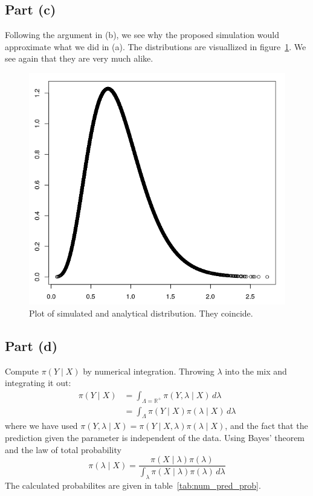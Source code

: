 \documentclass{article}
\begin{document}
\subsection{Part (c)}
Following the argument in (b),
we see why the proposed simulation would approximate what we did in (a).
The distributions are visuallized in figure~\ref{fig:cplot}.
We see again that they are very much alike.

\begin{figure}
	\centering
	\includegraphics[width=\textwidth]{cplot.png}
	\caption{Plot of simulated and analytical distribution. They coincide. \label{fig:cplot}}
\end{figure}
\afterpage{\clearpage}

\subsection{Part (d)}
Compute $\pi(Y \mid X)$ by numerical integration.
Throwing $\lambda$ into the mix and integrating it out:
\begin{align*}
	\pi(Y \mid X) &= \int_{\Lambda = \mathbb R^+} \pi(Y, \lambda \mid X) \, d\lambda \\
	&= \int_\Lambda \pi(Y \mid X) \pi(\lambda \mid X) \, d\lambda
\end{align*}
where we have used $\pi(Y, \lambda \mid X) = \pi(Y \mid X, \lambda) \pi(\lambda \mid X)$,
and the fact that the prediction given the parameter is independent of the data.
Using Bayes' theorem and the law of total probability
$$ \pi(\lambda \mid X) = \frac{\pi(X \mid \lambda) \pi(\lambda)}{\int_\lambda \pi(X \mid \lambda) \pi(\lambda) \, d\lambda} $$
The calculated probabilites are given in table~\ref{tab:num_pred_prob}. 
\end{document}
